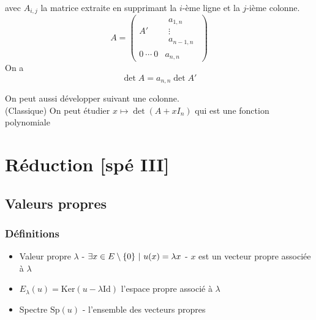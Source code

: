 \documentclass[openany]{book}
\begin{document}
avec $A_{i, j}$ la matrice extraite en supprimant la $i$-ème ligne et la $j$-ième colonne. \\

\[ 
A=
\left(
\begin{array}{c|c}
A' &
\begin{array}{c}
a_{1,n}\\
\vdots\\
a_{n-1,n}
\end{array}
\\ \hline
0 \ \cdots \ 0 & a_{n,n}
\end{array}
\right)
 \]
On a 
\[ \det A = a_{n, n} \det A' \]

On peut aussi développer suivant une colonne. \\
(Classique) On peut étudier $x \mapsto \det (A + xI_n)$ qui est une fonction polynomiale

\clearpage
\section{Réduction [spé III]}
\subsection{Valeurs propres}
\subsubsection{Définitions}
\begin{itemize}
    \item Valeur propre $\lambda$ - $\exists x \in E \setminus \{0\} \text{ } | \text{ } u(x) = \lambda x$ - $x$ est un vecteur propre associée à $\lambda$
    \item $E_\lambda (u) = \text{Ker}(u-\lambda \text{Id})$ l'espace propre associé à $\lambda$
    \item Spectre $\text{Sp}(u)$ - l'ensemble des vecteurs propres
\end{itemize}
\end{document}
